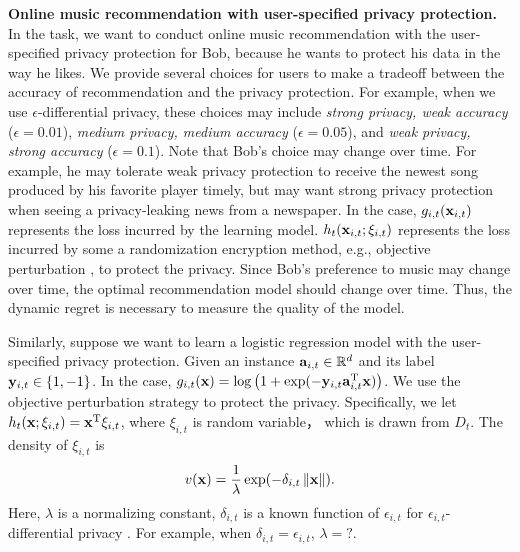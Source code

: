 \documentclass{article}
\begin{document}
{\textbf{Online music recommendation with user-specified privacy protection.} 
In the task, we want to conduct online music recommendation with the user-specified privacy protection for Bob, because he wants to protect his data in the way he likes. We provide several choices for users to make a tradeoff between the accuracy of recommendation and the privacy protection. For example, when we use $\epsilon$-differential privacy, these choices may include \textit{strong privacy, weak accuracy} ($\epsilon = 0.01$), \textit{medium privacy, medium accuracy} ($\epsilon = 0.05$), and \textit{weak privacy, strong accuracy} ($\epsilon = 0.1$).  
Note that Bob's choice may change over time. For example, he may tolerate weak privacy protection to receive the newest song produced by his favorite player timely, but may want strong privacy protection when seeing a privacy-leaking news from a newspaper. In the case, $g_{i,t}({\bf x}_{i,t})$ represents the loss incurred by the learning model. $h_t({\bf x}_{i,t};\xi_{i,t})$ represents the loss incurred by some a randomization encryption method, e.g., objective perturbation \citep{Chaudhuri:2011tr,NIPS2017_6865}, to protect the privacy.  Since Bob's preference to music may change over time, the optimal recommendation model should change over time. Thus, the dynamic regret is necessary to measure the quality of the model. 

Similarly, suppose we want to learn a logistic regression model with the user-specified privacy protection. Given an instance ${\bf a}_{i,t} \in \mathbb{R}^d$ and its label ${\bf y}_{i,t} \in \{1,-1\}$.  In the case, $g_{i,t}({\bf x}) = \log\left( 1 + \exp(-{\bf y}_{i,t}{\bf a}_{i,t}^{\rm T} {\bf x}) \right)$. We use the objective perturbation strategy \citep{Chaudhuri:2011tr,NIPS2017_6865} to protect the privacy. Specifically, we let $h_t({\bf x};\xi_{i,t}) = {\bf x}^{\rm T}\xi_{i,t}$, where $\xi_{i,t}$ is random variable， which is drawn from $D_t$. The density of $\xi_{i,t}$ is 
\begin{align}
\nonumber
v({\bf x}) = \frac{1}{\lambda}\exp(-\delta_{i,t} \left\lVert{\bf x}\right\rVert).
\end{align} Here, $\lambda$ is a normalizing constant, $\delta_{i,t}$ is a known function of $\epsilon_{i,t}$ for $\epsilon_{i,t}$-differential privacy \citep{Dwork:2014gx}. For example, when $\delta_{i,t} = \epsilon_{i,t}$, $\lambda = ?$. 













}
\end{document}
